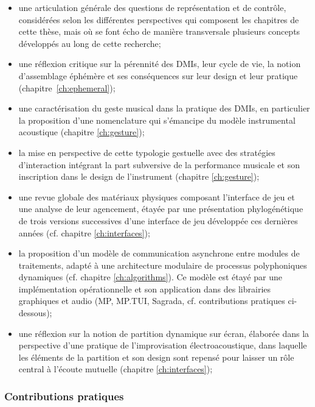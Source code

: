 \begin{itemize}[noitemsep]
\item une articulation générale des questions de représentation et de contrôle, considérées selon les différentes perspectives qui composent les chapitres de cette thèse, mais où se font écho de manière transversale plusieurs concepts développés au long de cette recherche;
\item une réflexion critique sur la pérennité des \glspl{DMI}, leur cycle de vie, la notion d'assemblage éphémère et ses conséquences sur leur design et leur pratique (chapitre~\ref{ch:ephemeral});
\item une caractérisation du geste musical dans la pratique des \glspl{DMI}, en particulier la proposition d'une nomenclature qui s'émancipe du modèle instrumental acoustique (chapitre \ref{ch:gesture});
\item la mise en perspective de cette typologie gestuelle avec des stratégies d'interaction intégrant la part subversive de la performance musicale et son inscription dans le design de l'instrument (chapitre \ref{ch:gesture});
\item une revue globale des matériaux physiques composant l'interface de jeu et une analyse de leur agencement, étayée par une présentation phylogénétique de trois versions successives d'une interface de jeu développée ces dernières années (cf. chapitre \ref{ch:interfaces});
\item la proposition d'un modèle de communication asynchrone entre modules de traitements, adapté à une architecture modulaire de processus polyphoniques dynamiques (cf. chapitre \ref{ch:algorithms}). Ce modèle est étayé par une implémentation opérationnelle et son application dans des librairies graphiques et audio  (MP, MP.TUI, Sagrada, cf. contributions pratiques ci-dessous);
\item une réflexion sur la notion de partition dynamique sur écran, élaborée dans la perspective d'une pratique de l'improvisation électroacoustique, dans laquelle les éléments de la partition et son design sont repensé pour laisser un rôle central à l'écoute mutuelle (chapitre \ref{ch:interfaces});
\end{itemize}

\subsubsection*{Contributions pratiques}

